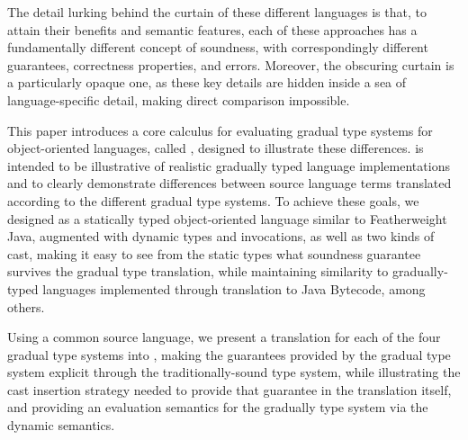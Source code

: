 \documentclass[a4paper,USenglish]{tex/lipics-v2016}
\newcommand{\code}[1]{{\tt #1}\xspace}
\begin{document}
The detail lurking behind the curtain of these different languages is that, to
attain their benefits and semantic features, each of these approaches has a
fundamentally different concept of soundness, with correspondingly different
guarantees, correctness properties, and errors. Moreover, the obscuring
curtain is a particularly opaque one, as these key details are hidden inside
a sea of language-specific detail, making direct comparison impossible.


This paper introduces a core calculus for evaluating gradual type systems for
object-oriented languages, called \kafka, designed to illustrate these
differences. \kafka is intended to be illustrative of realistic gradually
typed language implementations and to clearly demonstrate differences between
source language terms translated according to the different gradual type
systems. To achieve these goals, we designed \kafka as a statically typed
object-oriented language similar to Featherweight Java, augmented with dynamic
types and invocations, as well as two kinds of cast, making it easy to see
from the static \kafka types what soundness guarantee survives the gradual
type translation, while maintaining similarity to gradually-typed languages 
implemented through translation to Java Bytecode, among others.

Using a common source language, we present a translation for each of the four
gradual type systems into \kafka, making the guarantees provided by the
gradual type system explicit through the traditionally-sound \kafka type
system, while illustrating the cast insertion strategy needed to provide that
guarantee in the translation itself, and providing an evaluation semantics for
the gradually type system via the \kafka dynamic semantics.
\end{document}
